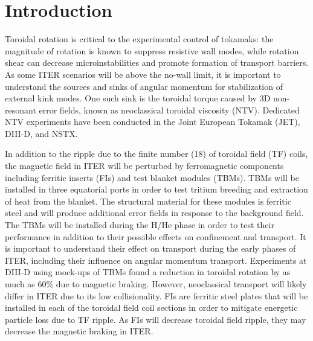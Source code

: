\documentclass[aip, pop, preprint]{revtex4-1}
\numberwithin{figure}{section}
\numberwithin{equation}{section}
\begin{document}
\section{Introduction}

Toroidal rotation is critical to the experimental control of tokamaks: the magnitude of rotation is known to suppress resistive wall modes,\cite{Bondeson1994, Garofalo2002} while rotation shear can decrease microinstabilities and promote formation of transport barriers.\cite{Burrell1997, Terry2000} As some ITER scenarios will be above the no-wall limit,\cite{Liu2004} it is important to understand the sources and sinks of angular momentum for stabilization of external kink modes. One such sink is the toroidal torque caused by 3D non-resonant error fields, known as neoclassical toroidal viscosity (NTV). Dedicated NTV experiments have been conducted in the Joint European Tokamak (JET),\cite{Lazzaro2002, DeVries2008} DIII-D,\cite{Garofalo2008} and NSTX.\cite{Zhu2006} 

In addition to the ripple due to the finite number (18) of toroidal field (TF) coils, the magnetic field in ITER will be perturbed by ferromagnetic components including ferritic inserts (FIs) and test blanket modules (TBMs). TBMs will be installed in three equatorial ports in order to test tritium breeding and extraction of heat from the blanket. The structural material for these modules is ferritic steel and will produce additional error fields in response to the background field. The TBMs will be installed during the H/He phase in order to test their performance in addition to their possible effects on confinement and transport.\cite{Chuyanov2010} It is important to understand their effect on transport during the early phases of ITER, including their influence on angular momentum transport. Experiments at DIII-D using mock-ups of TBMs found a reduction in toroidal rotation by as much as 60\% due to magnetic braking.\cite{Schaffer2011} However, neoclassical transport will likely differ in ITER due to its low collisionality. FIs are ferritic steel plates that will be installed in each of the toroidal field coil sections in order to mitigate energetic particle loss due to TF ripple.\cite{Tobita2003} As FIs will decrease toroidal field ripple, they may decrease the magnetic braking in ITER. 
\end{document}
